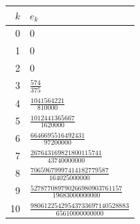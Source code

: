 \begin{tabular}{r@{\qquad}l}
\toprule
$k$ & $e_k$ \\
\midrule
0 & $0$ \\[1.2ex]
1 & $0$ \\[1.2ex]
2 & $0$ \\[1.2ex]
3 & $\frac{574}{375}$ \\[1.2ex]
4 & $\frac{1041564221}{810000}$ \\[1.2ex]
5 & $\frac{1012441365667}{1620000}$ \\[1.2ex]
6 & $\frac{6646695516492431}{97200000}$ \\[1.2ex]
7 & $\frac{267643169821800115741}{43740000000}$ \\[1.2ex]
8 & $\frac{70659679997414182779587}{164025000000}$ \\[1.2ex]
9 & $\frac{527877089790266980903761157}{19683000000000}$ \\[1.2ex]
10 & $\frac{98061225429543733697140528883}{65610000000000}$ \\[1.2ex]
\bottomrule
\end{tabular}
